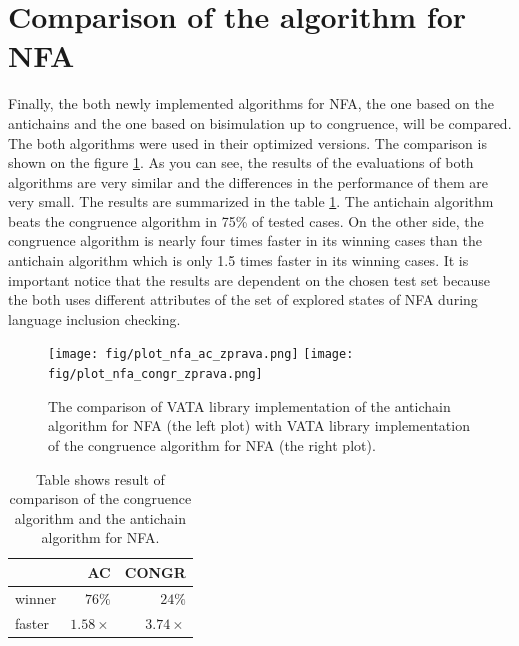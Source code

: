 \section{Comparison of the algorithm for NFA}
Finally, the both newly implemented algorithms for NFA, the one based on the antichains and the one based on bisimulation up to congruence, will be compared.
The both algorithms were used in their optimized versions.
The comparison is shown on the figure \ref{fig:figPlotNFA}.
As you can see, the results of the evaluations of both algorithms are very similar and the differences in the performance of
them are very small. 
The results are summarized in the table \ref{tabNFA}. The antichain algorithm beats the congruence algorithm in 75\% of
tested cases. On the other side, the congruence algorithm is nearly four times faster in its winning cases than the antichain algorithm which is
only 1.5 times faster in its winning cases. 
It is important notice that the results are dependent on the chosen test set because the both uses different attributes
of the set of explored states of NFA during language inclusion checking.

\begin{figure}[bt]
\begin{center}
\texttt{[image: fig/plot\_nfa\_ac\_zprava.png]}
\texttt{[image: fig/plot\_nfa\_congr\_zprava.png]}
\caption{The comparison of VATA library implementation of the antichain algorithm for NFA (the left plot)
    with VATA library implementation of the congruence algorithm for NFA (the right plot).}
\label{fig:figPlotNFA}
\end{center}
\end{figure}

\begin{table}[bt]
\begin{center}
\parbox{.45\linewidth}{
  \begin{tabular}[scale=0.3]{ | l | r | r |}
   \hline
    & \textbf{AC} & \textbf{CONGR} \\ \hline \hline
    winner & $76\%$ & $24\%$ \\ \hline
    faster & $1.58\times$ & $3.74\times$ \\ \hline
   \end{tabular}
}
   \caption{Table shows result of comparison of the congruence algorithm and the antichain algorithm for NFA.}
   \label{tabNFA}
\end{center}
\end{table}

